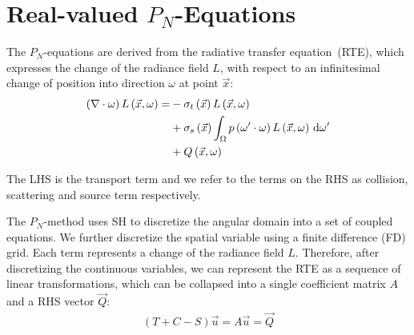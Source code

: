 





\section{Real-valued $P_N$-Equations}
\label{sec:pnequations}

The $P_N$-equations are derived from the radiative transfer equation~(RTE), which expresses the change of the radiance field $L$, with respect to an infinitesimal change of position into direction $\omega$ at point $\vec{x}$:
\begin{align}
\left(\nabla\cdot\omega\right)L\left(\vec{x}, \omega \right)
=&
-\sigma_t\left(\vec{x}\right) L\left(\vec{x}, \omega \right)\\
&
+\sigma_s\left(\vec{x}\right) \int_{\Omega}
{
p\left(\omega'\cdot\omega\right)L\left(\vec{x}, \omega \right)\,\mathrm{d}\omega'
}\\
&
+Q\left(\vec{x}, \omega\right)
\end{align}

The LHS is the transport term and we refer to the terms on the RHS as collision, scattering and source term respectively.

The $P_N$-method uses SH to discretize the angular domain into a set of coupled equations. We further discretize the spatial variable using a finite difference (FD) grid. Each term represents a change of the radiance field $L$. Therefore, after discretizing the continuous variables, we can represent the RTE as a sequence of linear transformations, which can be collapsed into a single coefficient matrix $A$ and a RHS vector $\vec{Q}$:
\begin{align}
(T+C-S)\vec{u} = A\vec{u} = \vec{Q}
\end{align}


